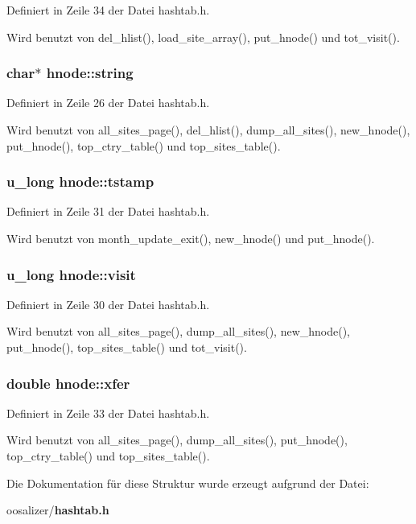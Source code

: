 Definiert in Zeile 34 der Datei hashtab.h.

Wird benutzt von del\_\-hlist(), load\_\-site\_\-array(), put\_\-hnode() und tot\_\-visit().
\subsubsection{\setlength{\rightskip}{0pt plus 5cm}char$\ast$ {\bf hnode::string}}\label{structhnode_eb54894424f88ea691ce2739a7b7ce80}




Definiert in Zeile 26 der Datei hashtab.h.

Wird benutzt von all\_\-sites\_\-page(), del\_\-hlist(), dump\_\-all\_\-sites(), new\_\-hnode(), put\_\-hnode(), top\_\-ctry\_\-table() und top\_\-sites\_\-table().
\subsubsection{\setlength{\rightskip}{0pt plus 5cm}u\_\-long {\bf hnode::tstamp}}\label{structhnode_e02fb87d76b57ad488493862bdd54f1e}




Definiert in Zeile 31 der Datei hashtab.h.

Wird benutzt von month\_\-update\_\-exit(), new\_\-hnode() und put\_\-hnode().
\subsubsection{\setlength{\rightskip}{0pt plus 5cm}u\_\-long {\bf hnode::visit}}\label{structhnode_e55f7c9efab364555b1fee0a61deb229}




Definiert in Zeile 30 der Datei hashtab.h.

Wird benutzt von all\_\-sites\_\-page(), dump\_\-all\_\-sites(), new\_\-hnode(), put\_\-hnode(), top\_\-sites\_\-table() und tot\_\-visit().
\subsubsection{\setlength{\rightskip}{0pt plus 5cm}double {\bf hnode::xfer}}\label{structhnode_8069d0fba422f3b79fdeef1e263f7141}




Definiert in Zeile 33 der Datei hashtab.h.

Wird benutzt von all\_\-sites\_\-page(), dump\_\-all\_\-sites(), put\_\-hnode(), top\_\-ctry\_\-table() und top\_\-sites\_\-table().

Die Dokumentation f\"{u}r diese Struktur wurde erzeugt aufgrund der Datei:\begin{CompactItemize}
\item 
oosalizer/{\bf hashtab.h}\end{CompactItemize}
